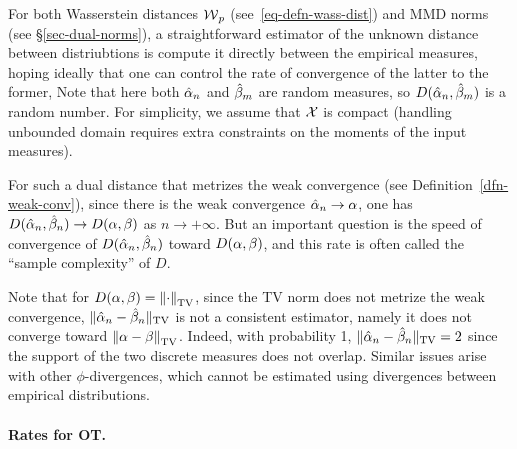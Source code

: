 For both Wasserstein distances $\operatorname{\mathcal{W}}_p$ (see~\ref{eq-defn-wass-dist}) and MMD norms (see \S\ref{sec-dual-norms}), a straightforward estimator of the unknown distance between distriubtions is compute it directly between the empirical measures, hoping ideally that one can control the rate of convergence of the latter to the former,
Note that here both $\hat {\alpha}_n$ and $\hat {\beta}_m$ are random measures, so $D(\hat {\alpha}_n,\hat {\beta}_m)$ is a random number. 
% 
For simplicity, we assume that $\mathcal{X}$ is compact (handling unbounded domain requires extra constraints on the moments of the input measures).

For such a dual distance that metrizes the weak convergence (see Definition~\ref{dfn-weak-conv}), since there is the weak convergence $\hat{\alpha}_n \rightarrow \alpha$, one has $D(\hat {\alpha}_n,\hat {\beta}_n) \rightarrow D(\alpha,\beta)$ as $n \rightarrow +\infty$.
%
But an important question is the speed of convergence of $D(\hat {\alpha}_n,\hat {\beta}_n)$ toward $D(\alpha,\beta)$, and this rate is often called the ``sample complexity'' of $D$. 

Note that for $D(\alpha,\beta) = \left\| \cdot \right\|_{\operatorname{TV}}$, since the TV norm does not metrize the weak convergence, $\| \hat {\alpha}_n - \hat {\beta}_n \|_{\operatorname{TV}}$ is not a consistent estimator, namely it does not converge toward $\left\| \alpha-\beta \right\|_{\operatorname{TV}}$. Indeed, with probability 1, $\| \hat {\alpha}_n - \hat {\beta}_n \|_{\operatorname{TV}}=2$ since the support of the two discrete measures does not overlap. Similar issues arise with other $\phi$-divergences, which cannot be estimated using divergences between empirical distributions.


\paragraph{Rates for OT.}

